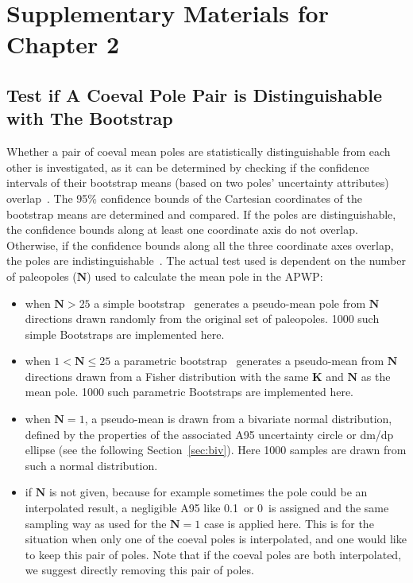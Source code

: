 \chapter{Supplementary Materials for Chapter 2}\label{appen4chp2}

\section{Test if A Coeval Pole Pair is Distinguishable with The Bootstrap}
Whether a pair of coeval mean poles are statistically distinguishable from each
other is investigated, as it can be determined by checking if the confidence
intervals of their bootstrap means (based on two poles' uncertainty attributes)
overlap~\citep{T91}. The 95\% confidence bounds of the Cartesian coordinates of
the bootstrap means are determined and compared. If the poles are
distinguishable, the confidence bounds along at least one coordinate axis do not
overlap. Otherwise, if the confidence bounds along all the three coordinate axes
overlap, the poles are indistinguishable~\citep{T91}. The actual test used is
dependent on the number of paleopoles ($\mathbf{N}$) used to calculate the mean
pole in the APWP$\colon$

\begin{itemize}
\item when $\mathbf{N}>25$ a simple bootstrap~\citep{T91} generates a
pseudo-mean pole from $\mathbf{N}$ directions drawn randomly from the original
set of paleopoles. 1000 such simple Bootstraps are implemented here.
\item when $1<\mathbf{N}\leq25$ a parametric bootstrap~\citep{T91} generates a
pseudo-mean from $\mathbf{N}$ directions drawn from a Fisher distribution with
the same $\mathbf{K}$ and $\mathbf{N}$ as the mean pole. 1000 such parametric
Bootstraps are implemented here.
\item when $\mathbf{N}=1$, a pseudo-mean is drawn from a bivariate normal
distribution, defined by the properties of the associated A95 uncertainty
circle or dm/dp ellipse (see the following Section~\ref{sec:biv}). Here 1000
samples are drawn from such a normal distribution.
\item if $\mathbf{N}$ is not given, because for example sometimes the pole could
be an interpolated result, a negligible A95 like 0.1\degree\ or 0\degree\ is
assigned and the same sampling way as used for the $\mathbf{N}=1$ case is
applied here. This is for the situation when only one of the coeval poles is
interpolated, and one would like to keep this pair of poles. Note that if the
coeval poles are both interpolated, we suggest directly removing this pair of
poles.
\end{itemize}

